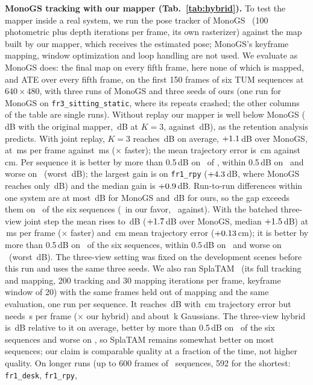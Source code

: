 \documentclass[10pt,twocolumn,letterpaper]{article}
\begin{document}
\textbf{MonoGS tracking with our mapper (Tab.~\ref{tab:hybrid}).} To test the mapper inside a real system, we run the pose tracker of MonoGS~\cite{matsuki2024gaussian} (100 photometric plus depth iterations per frame, its own rasterizer) against the map built by our mapper, which receives the estimated pose; MonoGS's keyframe mapping, window optimization and loop handling are not used. We evaluate as MonoGS does: the final map on every fifth frame, here none of which is mapped, and ATE over every fifth frame, on the first 150 frames of six TUM sequences at $640{\times}480$, with three runs of MonoGS and three seeds of ours (one run for MonoGS on \texttt{fr3\_sitting\_static}, where its repeats crashed; the other columns of the table are single runs). Without replay our mapper is well below MonoGS (\engHybOrigPsnr\,dB with the original mapper, \engHybKThreePsnr\,dB at $K{=}3$, against \engHybMonoPsnr\,dB), as the retention analysis predicts. With joint replay, $K{=}3$ reaches \engHybKThreeJrPsnr\,dB on average, $+1.1$\,dB over MonoGS, at \engHybKThreeJrMs\,ms per frame against \engHybMonoMs\,ms (\engHybSpeedup$\times$ faster); the mean trajectory error is \engHybKThreeJrAte\,cm against \engHybMonoAte\,cm. Per sequence it is better by more than 0.5\,dB on \engHybBetterScenes\ of \engHybScenes, within 0.5\,dB on \engHybEqualScenes\ and worse on \engHybWorstScenes\ (worst \engHybWorstGap\,dB); the largest gain is on \texttt{fr1\_rpy} ($+4.3$\,dB, where MonoGS reaches only \engHybMonoRpyPsnr\,dB) and the median gain is $+0.9$\,dB. Run-to-run differences within one system are at most \engHybMonoRangeMax\,dB for MonoGS and \engHybOursRangeMax\,dB for ours, so the gap exceeds them on \engHybClearScenes\ of the six sequences (\engHybBetterScenes\ in our favor, \engHybWorstScenes\ against). With the batched three-view joint step the mean rises to \engHybKThreeJrThreeBPsnr\,dB ($+1.7$\,dB over MonoGS, median $+1.5$\,dB) at \engHybKThreeJrThreeBMs\,ms per frame (\engHybSpeedupThreeB$\times$ faster) and \engHybKThreeJrThreeBAte\,cm mean trajectory error ($+0.13$\,cm); it is better by more than 0.5\,dB on \engHybBetterThreeB\ of the six sequences, within 0.5\,dB on \engHybEqualThreeB\ and worse on \engHybWorseThreeB\ (worst \engHybWorstGapThreeB\,dB). The three-view setting was fixed on the development scenes before this run and uses the same three seeds. We also ran SplaTAM~\cite{keetha2023splatam} (its full tracking and mapping, 200 tracking and 30 mapping iterations per frame, keyframe window of 20) with the same frames held out of mapping and the same evaluation, one run per sequence. It reaches \engSplPsnr\,dB with \engSplAte\,cm trajectory error but needs \engSplMs\,s per frame (\engSplSlowdown$\times$ our hybrid) and about \engSplGauss\,k Gaussians. The three-view hybrid is \engSplGapThreeB\,dB relative to it on average, better by more than 0.5\,dB on \engSplBetterScenes\ of the six sequences and worse on \engSplWorseScenes, so SplaTAM remains somewhat better on most sequences; our claim is comparable quality at a fraction of the time, not higher quality. On longer runs (up to 600 frames of \engFullScenes\ sequences, 592 for the shortest: \texttt{fr1\_desk}, \texttt{fr1\_rpy}, 
\end{document}

